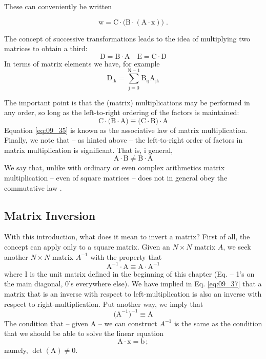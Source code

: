 These can conveniently be written

\begin{equation}
    \label{eq:09_32}
    \mathrm{w=C \cdot \Big( B \cdot (A \cdot x) \Big) \; .}%
\end{equation}

The concept of successive transformations leads to the idea of
multiplying two matrices to obtain a third:
\begin{equation}
    \label{eq:09_33}
    \mathrm{D = B \cdot A \quad E = C \cdot D}
\end{equation}
In terms of matrix elements we have, for example
\begin{equation}
    \label{eq:09_34}
    \mathrm{D_{ik} = \sum_{j=0}^{N-1} B_{ij} A_{jk}}
\end{equation}

The important point is that the (matrix) multiplications may be
performed in any order, so long as the left-to-right ordering of
the factors is maintained:
\begin{equation}
    \label{eq:09_35}
    \mathrm{C \cdot \big( B \cdot A \big) \equiv \big( C \cdot B \big) \cdot A}
\end{equation}
Equation \ref{eq:09_35} is known as the associative law of matrix
multiplication. Finally, we note that -- as hinted above -- the left-to-right
order of factors in matrix multiplication is significant. That is, i
general,
\begin{equation}
    \label{eq:09_36}
    \mathrm{A \cdot B \neq B \cdot A}
\end{equation}
We say that, unlike with ordinary or even complex arithmetics
matrix multiplication -- even of square matrices -- does not in
general obey the commutative law .

\subsection{Matrix Inversion}
With this introduction, what does it mean to invert a matrix? First
of all, the concept can apply only to a square matrix. Given an
$N \times N$ matrix $A$, we seek another $N \times N$ matrix $A^{-1}$ with the property that
\begin{equation}
    \label{eq:09_37}
    \mathrm{A^{-1} \cdot A \equiv A \cdot A^{-1}}
\end{equation} 
where I is the unit matrix defined in the beginning of this chapter
(Eq. -- 1's on the main diagonal, 0's everywhere else). We have
implied in Eq. \ref{eq:09_37} that a matrix that is an inverse with respect to
left-multiplication is also an inverse with respect to right-multiplication. Put another way, we imply that
\begin{equation}
    \label{eq:09_38}
    \mathrm{\Big(A^{-1} \Big)^{-1} \equiv A}
\end{equation} 
The condition that -- given A -- we can construct $A^{-1}$ is the same
as the condition that we should be able to solve the linear equation
\begin{equation*}
    \mathrm{A \cdot x = b \,;}
\end{equation*} 
 namely, $\det(\mathrm{A}) \neq 0$.

